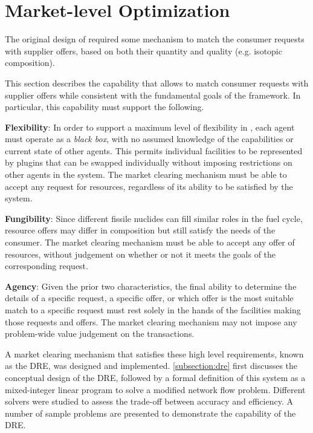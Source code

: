 \section{Market-level Optimization}\label{section:market}

The original design of \Cyclus required some mechanism to match the consumer
requests with supplier offers, based on both their quantity and quality
(e.g. isotopic composition).


This section describes the capability that allows \Cyclus to match consumer
requests with supplier offers while consistent with the fundamental goals of
the \Cyclus framework.  In particular, this capability must support the
following.

\vspace{1em}
\noindent\textbf{Flexibility}: In order to support a maximum level of
flexibility in \Cyclus, each agent must operate as a \textit{black box}, with
no assumed knowledge of the capabilities or current state of other agents.
This permits individual facilities to be represented by plugins that can be
swapped individually without imposing restrictions on other agents in the
system.  The market clearing mechanism must be able to accept any request for
resources, regardless of its ability to be satisfied by the system.

\vspace{1em}
\noindent\textbf{Fungibility}: Since different fissile nuclides can fill
similar roles in the fuel cycle, resource offers may differ in composition but
still satisfy the needs of the consumer.  The market clearing mechanism must
be able to accept any offer of resources, without judgement on whether or not
it meets the goals of the corresponding request.

\vspace{1em}
\noindent\textbf{Agency}: Given the prior two characteristics, the final
ability to determine the details of a specific request, a specific offer, or
which offer is the most suitable match to a specific request must rest solely
in the hands of the facilities making those requests and offers.  The market
clearing mechanism may not impose any problem-wide value judgement on the
transactions.
\vspace{1em}

A market clearing mechanism that satisfies these high level requirements,
known as the \gls{DRE}, was designed and implemented.  \ref{subsection:dre}
first discusses the conceptual design of the \gls{DRE}, followed by a formal
definition of this system as a mixed-integer linear program to solve a
modified network flow problem.  Different solvers were studied to assess the
trade-off between accuracy and efficiency.  A number of sample problems are
presented to demonstrate the capability of the \gls{DRE}.

